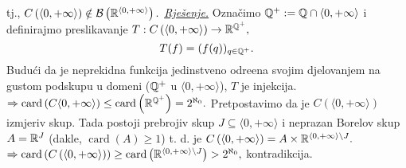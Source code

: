 \documentclass{article}
\newcommand{\card}{\operatorname{card}}
\begin{document}
 tj., \(C\left(\langle 0,+\infty\rangle\right)\notin\mathcal B\left(\Bbb R^{\langle0,+\infty\rangle}\right).\)\newline\newline
 \href{https://math.stackexchange.com/a/862973/721644}{\textit{Rješenje.}}\newline
 Označimo \(\Bbb Q^+:=\Bbb Q\cap\langle0,+\infty\rangle\) i definirajmo preslikavanje \(T:C\left(\langle0,+\infty\rangle\right)\to\Bbb R^{\Bbb Q^+},\) \[T(f)=(f(q))_{q\in\Bbb Q^+}.\] Budući da je neprekidna funkcija jedinstveno odre\dj{}ena svojim djelovanjem na gustom podskupu u domeni (\(\Bbb Q^+\) u \(\langle0,+\infty\rangle\)), \(T\) je injekcija. \(\Rightarrow\card\left(C\langle0,+\infty\rangle\right)\le\card\left(\Bbb R^{\Bbb Q^+}\right)=2^{\aleph_0}.\) Pretpostavimo da je \(C\left(\langle0,+\infty\rangle\right)\) izmjeriv skup. Tada postoji prebrojiv skup \(J\subseteq\langle0,+\infty\rangle\) i neprazan Borelov skup \(A=\Bbb R^J\) (dakle, \(\card(A)\ge 1\)) t. d. je \(C\left(\langle0,+\infty\rangle\right)=A\times\Bbb R^{\langle0,+\infty\rangle\setminus J}.\) \(\Rightarrow\card\left(C\left(\langle0,+\infty\rangle\right)\right)\ge\card\left(\Bbb R^{\langle0,+\infty\rangle\setminus J}\right)>2^{\aleph_0},\) kontradikcija.\newline\newline
\newpage
\end{document}
